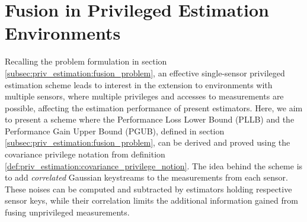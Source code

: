 % 
%                                                                                             
%                                                                                             
%                                                                                             
% 

\section{Fusion in Privileged Estimation Environments}\label{sec:priv_estimation:privileged_fusion}
Recalling the problem formulation in section \ref{subsec:priv_estimation:fusion_problem}, an effective single-sensor privileged estimation scheme leads to interest in the extension to environments with multiple sensors, where multiple privileges and accesses to measurements are possible, affecting the estimation performance of present estimators. Here, we aim to present a scheme where the Performance Loss Lower Bound (PLLB) and the Performance Gain Upper Bound (PGUB), defined in section \ref{subsec:priv_estimation:fusion_problem}, can be derived and proved using the covariance privilege notation from definition \ref{def:priv_estimation:covariance_privilege_notion}. The idea behind the scheme is to add \textit{correlated} Gaussian keystreams to the measurements from each sensor. These noises can be computed and subtracted by estimators holding respective sensor keys, while their correlation limits the additional information gained from fusing unprivileged measurements.

% 
% 

